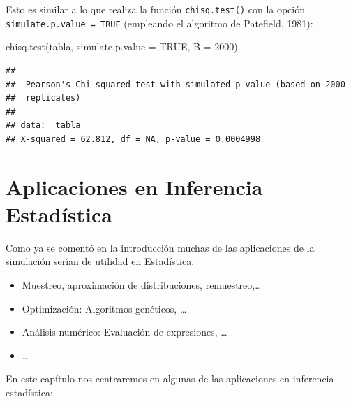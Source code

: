 \documentclass[
]{book}
\newenvironment{Shaded}{\begin{snugshade}}{\end{snugshade}}
\newcommand{\AttributeTok}[1]{\textcolor[rgb]{0.77,0.63,0.00}{#1}}
\newcommand{\ConstantTok}[1]{\textcolor[rgb]{0.00,0.00,0.00}{#1}}
\newcommand{\DecValTok}[1]{\textcolor[rgb]{0.00,0.00,0.81}{#1}}
\newcommand{\FunctionTok}[1]{\textcolor[rgb]{0.00,0.00,0.00}{#1}}
\newcommand{\NormalTok}[1]{#1}
\theoremstyle{break}
\theoremstyle{definition}
\theoremstyle{definition}
\theoremstyle{definition}
\theoremstyle{definition}
\theoremstyle{remark}
\begin{document}
Esto es similar a lo que realiza la función \texttt{chisq.test()} con la opción \texttt{simulate.p.value\ =\ TRUE} (empleando el algoritmo de Patefield, 1981):

\begin{Shaded}
\begin{Highlighting}[]
\FunctionTok{chisq.test}\NormalTok{(tabla, }\AttributeTok{simulate.p.value =} \ConstantTok{TRUE}\NormalTok{, }\AttributeTok{B =} \DecValTok{2000}\NormalTok{)}
\end{Highlighting}
\end{Shaded}

\begin{verbatim}
## 
##  Pearson's Chi-squared test with simulated p-value (based on 2000
##  replicates)
## 
## data:  tabla
## X-squared = 62.812, df = NA, p-value = 0.0004998
\end{verbatim}

\hypertarget{cap8}{%
\chapter{Aplicaciones en Inferencia Estadística}\label{cap8}}

Como ya se comentó en la introducción muchas de las aplicaciones de la simulación serían de utilidad en Estadística:

\begin{itemize}
\item
  Muestreo, aproximación de distribuciones,
  remuestreo,\ldots{}
\item
  Optimización: Algoritmos genéticos, \ldots{}
\item
  Análisis numérico: Evaluación de expresiones, \ldots{}
\item
  \ldots{}
\end{itemize}

En este capítulo nos centraremos en
algunas de las aplicaciones en inferencia estadística:
\end{document}
